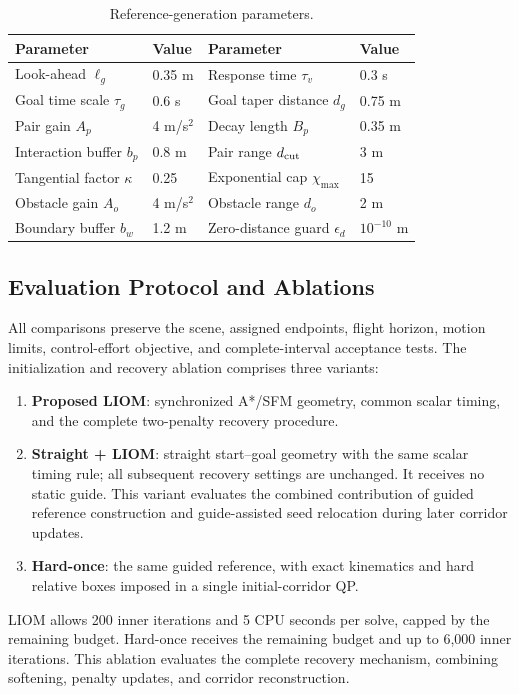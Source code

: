 \begin{table}[htbp]
\caption{Reference-generation parameters.\label{tab:initialization}}
\small\begin{tabularx}{\textwidth}{lYlY}
\toprule Parameter & Value & Parameter & Value \\
\midrule
Look-ahead $\ell_g$ & 0.35 m & Response time $\tau_v$ & 0.3 s \\
Goal time scale $\tau_g$ & 0.6 s & Goal taper distance $d_g$ & 0.75 m \\
Pair gain $A_p$ & 4 m/s$^2$ & Decay length $B_p$ & 0.35 m \\
Interaction buffer $b_p$ & 0.8 m & Pair range $d_{\rm cut}$ & 3 m \\
Tangential factor $\kappa$ & 0.25 & Exponential cap $\chi_{\max}$ & 15 \\
Obstacle gain $A_o$ & 4 m/s$^2$ & Obstacle range $d_o$ & 2 m \\
Boundary buffer $b_w$ & 1.2 m & Zero-distance guard $\epsilon_d$ & $10^{-10}$ m \\
\bottomrule\end{tabularx}
\end{table}

\subsection{Evaluation Protocol and Ablations}
All comparisons preserve the scene, assigned endpoints, flight horizon, motion limits, control-effort objective, and complete-interval acceptance tests. The initialization and recovery ablation comprises three variants:
\begin{enumerate}
\item \textbf{Proposed LIOM}: synchronized A*/SFM geometry, common scalar timing, and the complete two-penalty recovery procedure.
\item \textbf{Straight + LIOM}: straight start--goal geometry with the same scalar timing rule; all subsequent recovery settings are unchanged. It receives no static guide. This variant evaluates the combined contribution of guided reference construction and guide-assisted seed relocation during later corridor updates.
\item \textbf{Hard-once}: the same guided reference, with exact kinematics and hard relative boxes imposed in a single initial-corridor QP.
\end{enumerate}
LIOM allows 200 inner iterations and 5 CPU seconds per solve, capped by the remaining budget. Hard-once receives the remaining budget and up to 6,000 inner iterations. This ablation evaluates the complete recovery mechanism, combining softening, penalty updates, and corridor reconstruction.

